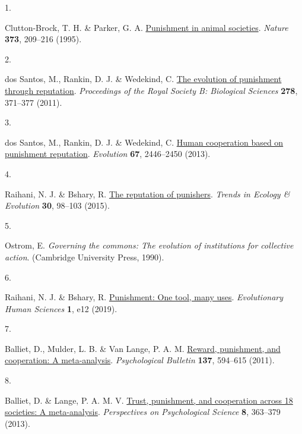 \documentclass[
  man,floatsintext]{apa6}
\newlength{\cslhangindent}
\newlength{\csllabelwidth}
\newlength{\cslentryspacingunit} %
\newenvironment{CSLReferences}[2] %
 {%
  \setlength{\parindent}{0pt}
  \ifodd #1
  \let\oldpar\par
  \def\par{\hangindent=\cslhangindent\oldpar}
  \fi
  \setlength{\parskip}{#2\cslentryspacingunit}
 }%
 {}
\newcommand{\CSLLeftMargin}[1]{\parbox[t]{\csllabelwidth}{#1}}
\newcommand{\CSLRightInline}[1]{\parbox[t]{\linewidth - \csllabelwidth}{#1}\break}
\begin{document}
\hypertarget{refs}{}
\begin{CSLReferences}{0}{0}
\leavevmode{}%
\CSLLeftMargin{1. }%
\CSLRightInline{Clutton-Brock, T. H. \& Parker, G. A. \href{https://doi.org/10.1038/373209a0}{Punishment in animal societies}. \emph{Nature} \textbf{373}, 209--216 (1995).}

\leavevmode{}%
\CSLLeftMargin{2. }%
\CSLRightInline{dos Santos, M., Rankin, D. J. \& Wedekind, C. \href{https://doi.org/10.1098/rspb.2010.1275}{The evolution of punishment through reputation}. \emph{Proceedings of the Royal Society B: Biological Sciences} \textbf{278}, 371--377 (2011).}

\leavevmode{}%
\CSLLeftMargin{3. }%
\CSLRightInline{dos Santos, M., Rankin, D. J. \& Wedekind, C. \href{https://www.jstor.org/stable/24032701}{Human cooperation based on punishment reputation}. \emph{Evolution} \textbf{67}, 2446--2450 (2013).}

\leavevmode{}%
\CSLLeftMargin{4. }%
\CSLRightInline{Raihani, N. J. \& Bshary, R. \href{https://doi.org/10.1016/j.tree.2014.12.003}{The reputation of punishers}. \emph{Trends in Ecology \& Evolution} \textbf{30}, 98--103 (2015).}

\leavevmode{}%
\CSLLeftMargin{5. }%
\CSLRightInline{Ostrom, E. \emph{Governing the commons: The evolution of institutions for collective action}. (Cambridge University Press, 1990).}

\leavevmode{}%
\CSLLeftMargin{6. }%
\CSLRightInline{Raihani, N. J. \& Bshary, R. \href{https://doi.org/10.1017/ehs.2019.12}{Punishment: One tool, many uses}. \emph{Evolutionary Human Sciences} \textbf{1}, e12 (2019).}

\leavevmode{}%
\CSLLeftMargin{7. }%
\CSLRightInline{Balliet, D., Mulder, L. B. \& Van Lange, P. A. M. \href{https://doi.org/10.1037/a0023489}{Reward, punishment, and cooperation: A meta-analysis}. \emph{Psychological Bulletin} \textbf{137}, 594--615 (2011).}

\leavevmode{}%
\CSLLeftMargin{8. }%
\CSLRightInline{Balliet, D. \& Lange, P. A. M. V. \href{https://doi.org/10.1177/1745691613488533}{Trust, punishment, and cooperation across 18 societies: A meta-analysis}. \emph{Perspectives on Psychological Science} \textbf{8}, 363--379 (2013).}


\end{CSLReferences}
\end{document}

